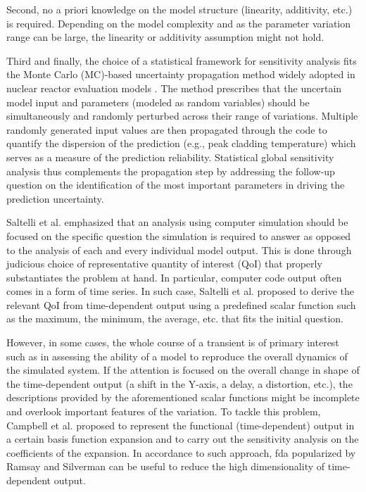 Second, no a priori knowledge on the model structure (linearity, additivity, etc.) is required. 
Depending on the model complexity and as the parameter variation range can be large, 
the linearity or additivity assumption might not hold.

Third and finally, 
the choice of a statistical framework for sensitivity analysis fits the Monte Carlo (MC)-based uncertainty propagation method widely adopted in nuclear reactor evaluation models \cite{Boyack1990, Nutt2004, Wallis2007, Glaeser2008}. 
The method prescribes that the uncertain model input and parameters (modeled as random variables) 
should be simultaneously and randomly perturbed across their range of variations. 
Multiple randomly generated input values are then propagated through the code to quantify the dispersion of the prediction (e.g., peak cladding temperature) 
which serves as a measure of the prediction reliability. 
Statistical global sensitivity analysis thus complements the propagation step 
by addressing the follow-up question on the identification of the most important parameters in driving the prediction uncertainty. 

Saltelli et al. \cite{Saltelli2006} emphasized that an analysis using computer simulation 
should be focused on the specific question the simulation is required to answer 
as opposed to the analysis of each and every individual model output. 
This is done through judicious choice of representative quantity of interest (QoI) 
that properly substantiates the problem at hand. 
In particular, computer code output often comes in a form of time series. 
In such case, Saltelli et al. \cite{Saltelli2008,Saltelli2004} proposed to derive the relevant QoI from time-dependent output 
using a predefined scalar function such as the maximum, the minimum, the average, etc. that fits the initial question.

However, in some cases, the whole course of a transient is of primary interest 
such as in assessing the ability of a model to reproduce the overall dynamics of the simulated system. 
If the attention is focused on the overall change in shape of the time-dependent output (a shift in the Y-axis, a delay, a distortion, etc.), 
the descriptions provided by the aforementioned scalar functions might be incomplete and overlook important features of the variation. 
To tackle this problem, Campbell et al. \cite{Campbell2006} proposed to represent the functional (time-dependent) output in a certain basis function expansion 
and to carry out the sensitivity analysis on the coefficients of the expansion. 
In accordance to such approach, \gls{fda} popularized by Ramsay and Silverman \cite{Ramsay2005} can be useful to reduce the high dimensionality of time-dependent output.

